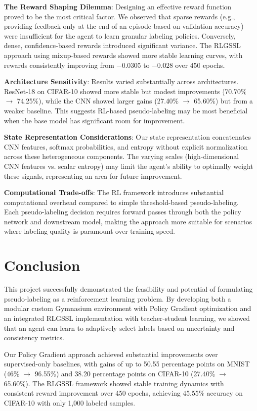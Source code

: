 \documentclass[pdflatex,sn-mathphys-num]{sn-jnl}%
\theoremstyle{thmstyleone}%
\theoremstyle{thmstyletwo}%
\theoremstyle{thmstylethree}%
\begin{document}
\textbf{The Reward Shaping Dilemma}: Designing an effective reward function proved to be the most critical factor. We observed that sparse rewards (e.g., providing feedback only at the end of an episode based on validation accuracy) were insufficient for the agent to learn granular labeling policies. Conversely, dense, confidence-based rewards introduced significant variance. The RLGSSL approach using mixup-based rewards showed more stable learning curves, with rewards consistently improving from $-0.0305$ to $-0.028$ over 450 epochs.

\textbf{Architecture Sensitivity}: Results varied substantially across architectures. ResNet-18 on CIFAR-10 showed more stable but modest improvements (70.70\% $\rightarrow$ 74.25\%), while the CNN showed larger gains (27.40\% $\rightarrow$ 65.60\%) but from a weaker baseline. This suggests RL-based pseudo-labeling may be most beneficial when the base model has significant room for improvement.

\textbf{State Representation Considerations}: Our state representation concatenates CNN features, softmax probabilities, and entropy without explicit normalization across these heterogeneous components. The varying scales (high-dimensional CNN features vs. scalar entropy) may limit the agent's ability to optimally weight these signals, representing an area for future improvement.

\textbf{Computational Trade-offs}: The RL framework introduces substantial computational overhead compared to simple threshold-based pseudo-labeling. Each pseudo-labeling decision requires forward passes through both the policy network and downstream model, making the approach more suitable for scenarios where labeling quality is paramount over training speed.

\section{Conclusion}\label{sec:conclusion}

This project successfully demonstrated the feasibility and potential of formulating pseudo-labeling as a reinforcement learning problem. By developing both a modular custom Gymnasium environment with Policy Gradient optimization and an integrated RLGSSL implementation with teacher-student learning, we showed that an agent can learn to adaptively select labels based on uncertainty and consistency metrics.

Our Policy Gradient approach achieved substantial improvements over supervised-only baselines, with gains of up to 50.55 percentage points on MNIST (46\% $\rightarrow$ 96.55\%) and 38.20 percentage points on CIFAR-10 (27.40\% $\rightarrow$ 65.60\%). The RLGSSL framework showed stable training dynamics with consistent reward improvement over 450 epochs, achieving 45.55\% accuracy on CIFAR-10 with only 1,000 labeled samples.
\end{document}
